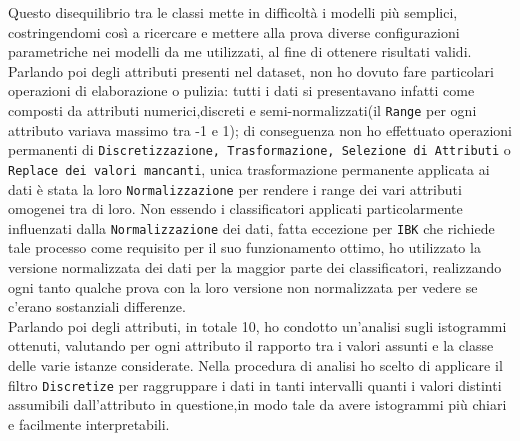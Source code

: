 Questo disequilibrio tra le classi mette in difficoltà i modelli più semplici, costringendomi così a ricercare e mettere alla prova diverse configurazioni parametriche nei modelli da me utilizzati, al fine di ottenere risultati validi.
Parlando poi degli attributi presenti nel dataset, non ho dovuto fare particolari operazioni di elaborazione o pulizia: tutti i dati si presentavano infatti come composti da attributi numerici,discreti e semi-normalizzati(il \texttt{Range} per ogni attributo variava massimo tra -1 e 1); di conseguenza non ho effettuato operazioni permanenti di \texttt{Discretizzazione, Trasformazione, Selezione di Attributi} o \texttt{Replace dei valori mancanti}, unica trasformazione permanente applicata ai dati è stata la loro \texttt{Normalizzazione} per rendere i range dei vari attributi omogenei tra di loro.
Non essendo i classificatori applicati particolarmente influenzati dalla \texttt{Normalizzazione} dei dati, fatta eccezione per \texttt{IBK} che richiede tale processo come requisito per il suo funzionamento ottimo, ho utilizzato la versione normalizzata dei dati per la maggior parte dei classificatori, realizzando ogni tanto qualche prova con la loro versione non normalizzata per vedere se c'erano sostanziali differenze.\\
Parlando poi degli attributi, in totale 10, ho condotto un'analisi sugli istogrammi ottenuti, valutando per ogni attributo il rapporto tra i valori assunti e la classe delle varie istanze considerate.
Nella procedura di analisi ho scelto di applicare il filtro \texttt{Discretize} per raggruppare i dati in tanti intervalli quanti i valori distinti assumibili dall'attributo in questione,in modo tale da avere istogrammi più chiari e facilmente interpretabili.

